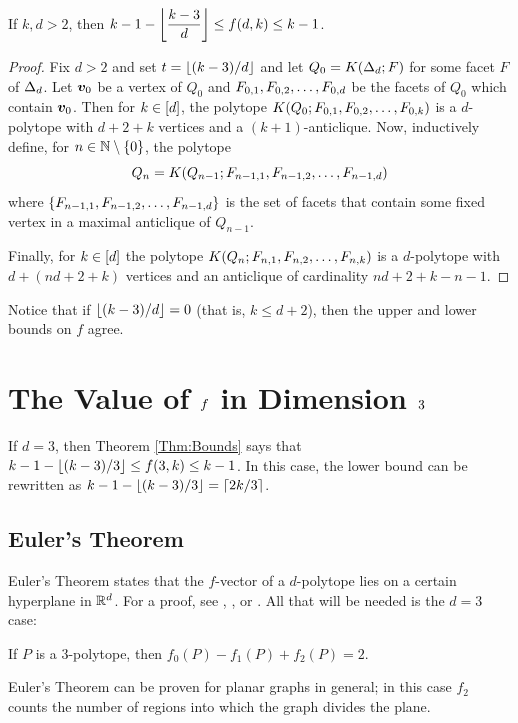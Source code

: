 \begin{Theorem}\label{Thm:Bounds}
    If \(k,d>2\), then \(\displaystyle k-1-\left\lfloor\frac{k-3}d\right\rfloor\le f(d,k)\le k-1\).
\end{Theorem}
\begin{proof}
    Fix \(d>2\) and set \(t=\left\lfloor(k-3)/d\right\rfloor\) and let \(Q_0=K(\Delta_{d};F)\) for some facet \(F\) of \(\Delta_{d}\).  Let \(\bm{v}_0\) be a vertex of \(Q_0\) and \(F_{0,1},F_{0,2},\dotsc, F_{0,d}\) be the facets of \(Q_0\) which contain \(\bm{v}_0\).  Then for \(k\in\left[d\right]\), the polytope \(K(Q_0;F_{0,1},F_{0,2},\dotsc, F_{0,k})\) is a \(d\)-polytope with \(d+2+k\) vertices and a \((k+1)\)-anticlique.  Now, inductively define, for \(n\in\mathbb{N}\setminus\left\{0\right\}\), the polytope
        \[
            Q_n
                =
                    K(Q_{n-1};F_{n-1,1},F_{n-1,2},\dotsc, F_{n-1,d})
        \]
    where \(\left\{F_{n-1,1},F_{n-1,2},\dotsc, F_{n-1,d}\right\}\) is the set of facets that contain some fixed vertex in a maximal anticlique of \(Q_{n-1}\).

    Finally, for \(k\in\left[d\right]\) the polytope \(K(Q_n;F_{n,1},F_{n,2},\dotsc, F_{n,k})\) is a \(d\)-polytope with \(d+(nd+2+k)\) vertices and an anticlique of cardinality \(nd+2+k-n-1\).
\end{proof}

Notice that if \(\left\lfloor(k-3)/d\right\rfloor=0\) (that is, \(k\le d+2\)), then the upper and lower bounds on \(f\) agree.

\section{The Value of \protect$f\protect$ in Dimension \protect$3\protect$}

If \(d=3\), then Theorem \ref{Thm:Bounds} says that \( k-1-\left\lfloor(k-3)/3\right\rfloor\le f(3,k)\le k-1\).  In this case, the lower bound can be rewritten as \(\displaystyle k-1-\left\lfloor(k-3)/3\right\rfloor=\left\lceil2k/3\right\rceil\).

    \subsection{Euler's Theorem}
        Euler's Theorem states that the \(f\)-vector of a \(d\)-polytope lies on a certain hyperplane in \(\mathbb{R}^{d}\).  For a proof, see \cite{GrunBook}, \cite{McMullenBook}, or \cite{ZieglerBook}.  All that will be needed is the \(d=3\) case:
            \begin{Theorem}[Euler]
                If \(P\) is a \(3\)-polytope, then \(f_0(P)-f_1(P)+f_2(P)=2\).
            \end{Theorem}
        Euler's Theorem can be proven for planar graphs in general; in this case \(f_2\) counts the number of regions into which the graph divides the plane.

